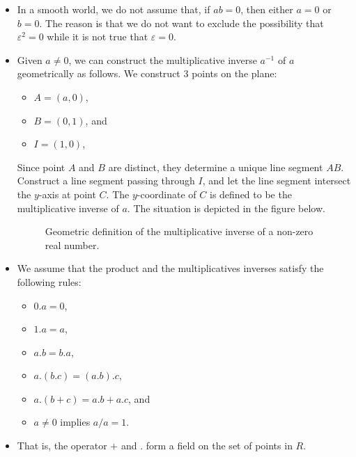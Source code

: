 \documentclass[10pt]{article}
\begin{document}
\begin{itemize}
  	\item In a smooth world, we do not assume that, if $ab = 0$, then either $a = 0$ or $b = 0$. The reason is that we do not want to exclude the possibility that $\varepsilon^2 = 0$ while it is not true that $\varepsilon = 0$.

  	\item Given $a \neq 0$, we can construct the multiplicative inverse $a^{-1}$ of $a$ geometrically as follows. We construct 3 points on the plane:
  	\begin{itemize}
  	  \item $A = (a,0)$,
  	  \item $B = (0,1)$, and
  	  \item $I = (1,0)$,
  	\end{itemize}
  	Since point $A$ and $B$ are distinct, they determine a unique line segment $AB$. Construct a line segment passing through $I$, and let the line segment intersect the $y$-axis at point $C$. The $y$-coordinate of $C$ is defined to be the multiplicative inverse of $a$. The situation is depicted in the figure below.

  	\begin{figure}[h]
  		\centering
  		\caption{Geometric definition of the multiplicative inverse of a non-zero real number.}	
  	\end{figure}

  	\item We assume that the product and the multiplicatives inverses satisfy the following rules:
  	\begin{itemize}
  		\item $0.a = 0$,
  		\item $1.a = a$,
  		\item $a.b = b.a$,
  		\item $a.(b.c) = (a.b).c$,
  		\item $a.(b+c) = a.b + a.c$, and
  		\item $a \neq 0$ implies $a/a = 1$.
  	\end{itemize}

  	\item That is, the operator $+$ and $.$ form a field on the set of points in $R$.
  \end{itemize}
  

	
  
     
\end{document}

